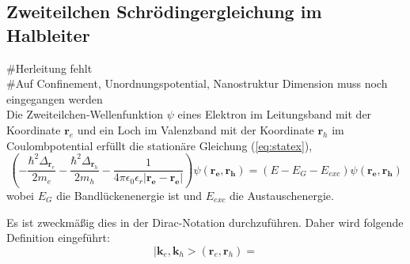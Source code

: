 \subsection{Zweiteilchen Schrödingergleichung im Halbleiter}\label{kapitel12}
\#Herleitung fehlt\\ 
\#Auf Confinement, Unordnungspotential, Nanostruktur Dimension muss noch eingegangen werden\\
Die Zweiteilchen-Wellenfunktion $\psi$ eines Elektron im Leitungsband mit der Koordinate $\boldsymbol{r}_e$ und ein Loch im Valenzband mit der Koordinate $\boldsymbol{r}_h$ im Coulombpotential erfüllt die stationäre Gleichung (\ref{eq:statex}),
\begin{equation}\label{eq:statex}
\left( 
-\frac{\hbar^2\Delta_{\boldsymbol{r}_e}}{2m_e} 
-\frac{\hbar^2\Delta_{\boldsymbol{r}_h}}{2m_h} 
-\frac{1}{4\pi \epsilon_0\epsilon_r |\boldsymbol{r_e}-\boldsymbol{r_e}|}
\right)\psi(\boldsymbol{r_e},\boldsymbol{r_h})=
\left(
E-E_G-E_{exc}
\right)\psi(\boldsymbol{r_e},\boldsymbol{r_h})
\end{equation}
wobei $E_G$ die Bandlückenenergie ist und $E_{exc}$ die Austauschenergie.

Es ist zweckmäßig dies in der Dirac-Notation durchzuführen.
Daher wird folgende Definition eingeführt:
\begin{equation}
|\boldsymbol{k}_e,\boldsymbol{k}_h>(\boldsymbol{r}_e,\boldsymbol{r}_h)=
\end{equation}